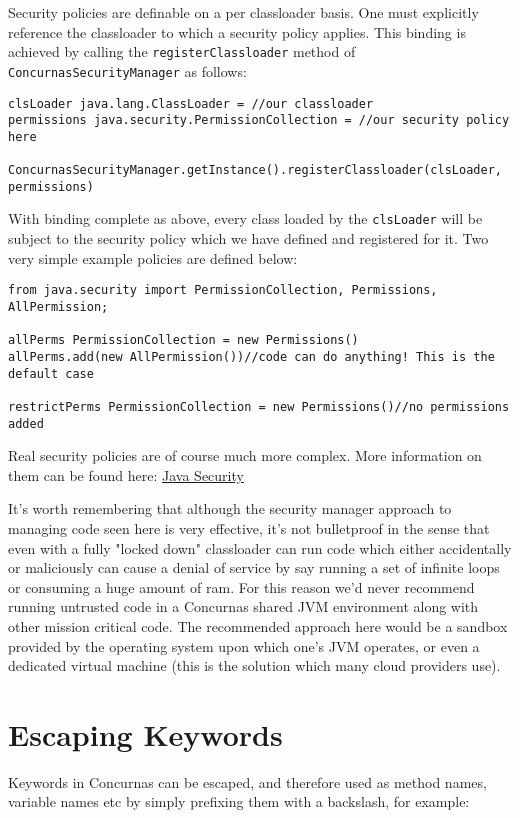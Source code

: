 \documentclass[conc-doc]{subfiles}
\begin{document}
Security policies are definable on a per classloader basis. One must explicitly reference the classloader to which a security policy applies. This binding is achieved by calling the \lstinline{registerClassloader} method of \lstinline{ConcurnasSecurityManager} as follows:

\begin{lstlisting}
clsLoader java.lang.ClassLoader = //our classloader
permissions java.security.PermissionCollection = //our security policy here

ConcurnasSecurityManager.getInstance().registerClassloader(clsLoader, permissions)
\end{lstlisting}

With binding complete as above, every class loaded by the \lstinline{clsLoader} will be subject to the security policy which we have defined and registered for it. Two very simple example policies are defined below:

\begin{lstlisting}
from java.security import PermissionCollection, Permissions, AllPermission;

allPerms PermissionCollection = new Permissions()
allPerms.add(new AllPermission())//code can do anything! This is the default case

restrictPerms PermissionCollection = new Permissions()//no permissions added
\end{lstlisting}

Real security policies are of course much more complex. More information on them can be found here: \href{https://docs.oracle.com/javase/8/docs/technotes/guides/security/spec/security-spec.doc3.html}{Java Security}

It's worth remembering that although the security manager approach to managing code seen here is very effective, it's not bulletproof in the sense that even with a fully "locked down" classloader can run code which either accidentally or maliciously can cause a denial of service by say running a set of infinite loops or consuming a huge amount of ram. For this reason we'd never recommend running untrusted code in a Concurnas shared JVM environment along with other mission critical code. The recommended approach here would be a sandbox provided by the operating system upon which one's JVM operates, or even a dedicated virtual machine (this is the solution which many cloud providers use).

\section{Escaping Keywords}
Keywords in Concurnas can be escaped, and therefore used as method names, variable names etc by simply prefixing them with a backslash, for example:
\end{document}
